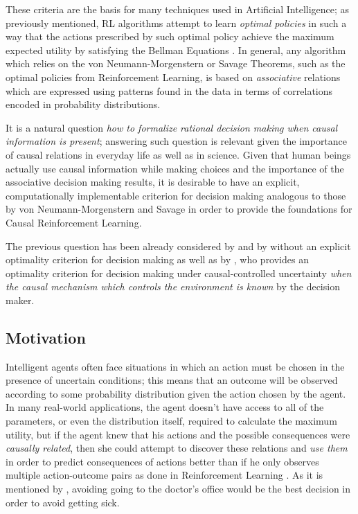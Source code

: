 \documentclass[review]{elsarticle}
\begin{document}
These criteria are the basis for many techniques used in Artificial Intelligence; as previously mentioned, RL algorithms attempt to learn \textit{optimal policies} in such a way that the actions prescribed by such optimal policy achieve the maximum expected utility by satisfying the Bellman Equations \citep{sutton1998reinforcement,webb2007game}. In general, any algorithm which relies on the von Neumann-Morgenstern or Savage Theorems, such as the optimal policies from Reinforcement Learning, is based on \textit{associative} relations which are expressed using patterns found in the data in terms of correlations encoded in probability distributions. 

It is a natural question \textit{how to formalize rational decision making when causal information is present}; answering such question is relevant given the importance of causal relations in everyday life as well as in science. Given that human beings actually use causal information while making choices and the importance of the associative decision making results, it is desirable to have an explicit, computationally implementable criterion for decision making analogous to those by von Neumann-Morgenstern and Savage in order to provide the foundations for Causal Reinforcement Learning.

The previous question has been already considered by \cite{nozick1969newcomb,lewis1981causal} and by \cite{joyce1999foundations} without an explicit optimality criterion for decision making as well as by \cite{pearl2009causality}, who provides an optimality criterion for decision making under causal-controlled uncertainty \textit{when the causal mechanism which controls the environment is known} by the decision maker. 

\subsection{Motivation}
\label{Motivation}
Intelligent agents often face situations in which an action must be chosen in the presence of uncertain conditions; this means that an outcome will be observed according to some probability distribution given the action chosen by the agent. In many real-world applications, the agent doesn't have access to all of the parameters, or even the distribution itself, required to calculate the maximum utility, but if the agent knew that his actions and the possible consequences were \textit{causally related}, then she could attempt to discover these relations and \textit{use them} in order to predict consequences of actions better than if he only observes multiple action-outcome pairs as done in Reinforcement Learning \citep{sutton1998reinforcement}. As it is mentioned by \cite{pearl2009causality}, avoiding going to the doctor's office would be the best decision in order to avoid getting sick.
	
\end{document}
